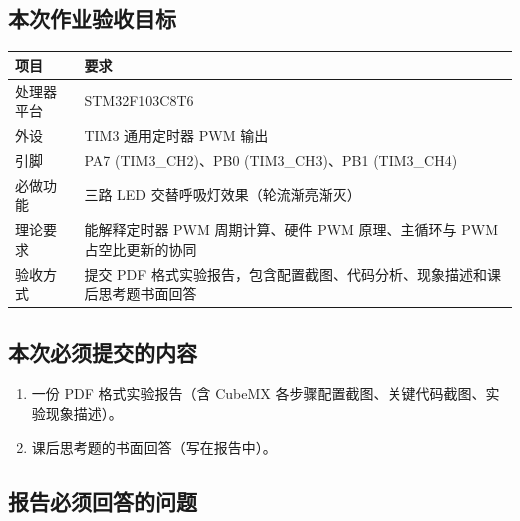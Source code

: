 \documentclass[
  chinese,
  UTF8,
  oneside,
  openany]{ctexbook}
\providecommand{\tightlist}{%
  \setlength{\itemsep}{0pt}\setlength{\parskip}{0pt}}
\begin{document}
\subsection{本次作业验收目标}\label{ux672cux6b21ux4f5cux4e1aux9a8cux6536ux76eeux6807-7}

\begin{longtable}[]{@{}
  >{\raggedright\arraybackslash}p{}
  >{\raggedright\arraybackslash}p{}@{}}
\toprule\noalign{}
\begin{minipage}[b]{\linewidth}\raggedright
项目
\end{minipage} & \begin{minipage}[b]{\linewidth}\raggedright
要求
\end{minipage} \\
\midrule\noalign{}
\endhead
\bottomrule\noalign{}
\endlastfoot
处理器平台 & STM32F103C8T6 \\
外设 & TIM3 通用定时器 PWM 输出 \\
引脚 & PA7 (TIM3\_CH2)、PB0 (TIM3\_CH3)、PB1 (TIM3\_CH4) \\
必做功能 & 三路 LED 交替呼吸灯效果（轮流渐亮渐灭） \\
理论要求 & 能解释定时器 PWM 周期计算、硬件 PWM 原理、主循环与 PWM
占空比更新的协同 \\
验收方式 & 提交 PDF
格式实验报告，包含配置截图、代码分析、现象描述和课后思考题书面回答 \\
\end{longtable}

\subsection{本次必须提交的内容}\label{ux672cux6b21ux5fc5ux987bux63d0ux4ea4ux7684ux5185ux5bb9-7}

\begin{enumerate}
\def\labelenumi{\arabic{enumi}.}
\tightlist
\item
  一份 PDF 格式实验报告（含 CubeMX
  各步骤配置截图、关键代码截图、实验现象描述）。
\item
  课后思考题的书面回答（写在报告中）。
\end{enumerate}

\subsection{报告必须回答的问题}\label{ux62a5ux544aux5fc5ux987bux56deux7b54ux7684ux95eeux9898-7}
\end{document}
